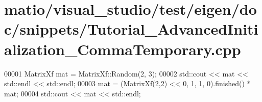 \hypertarget{matio_2visual__studio_2test_2eigen_2doc_2snippets_2_tutorial___advanced_initialization___comma_temporary_8cpp_source}{}\section{matio/visual\+\_\+studio/test/eigen/doc/snippets/\+Tutorial\+\_\+\+Advanced\+Initialization\+\_\+\+Comma\+Temporary.cpp}
\label{matio_2visual__studio_2test_2eigen_2doc_2snippets_2_tutorial___advanced_initialization___comma_temporary_8cpp_source}

\begin{DoxyCode}
00001 MatrixXf mat = MatrixXf::Random(2, 3);
00002 std::cout << mat << std::endl << std::endl;
00003 mat = (MatrixXf(2,2) << 0, 1, 1, 0).finished() * mat;
00004 std::cout << mat << std::endl;
\end{DoxyCode}
